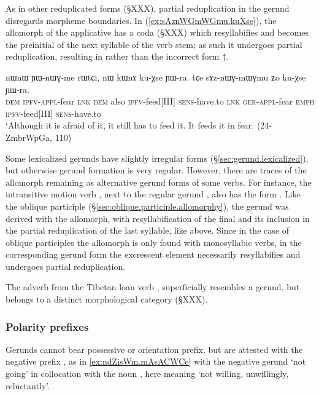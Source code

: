 As in other reduplicated forms (§XXX), partial reduplication in the gerund disregards morpheme boundaries. In (\ref{ex:sAznWGmWGmu.kuXse}), the allomorph  of the applicative has a coda  (§XXX) which resyllabifies and becomes the preinitial of the next syllable of the verb stem; as such it undergoes partial reduplication, resulting in  rather than the incorrect form $\dagger$.


\begin{exe}
\ex \label{ex:sAznWGmWGmu.kuXse}
\gll  nɯnɯ ɲɯ-nɯɣ-me rɯtɕi, nɯ kɯnɤ ku-χse ɲɯ-ra. tɕe sɤz-nɯɣ-mɯ\redp{}ɣmu ʑo ku-χse ɲɯ-ra. \\
\textsc{dem} \textsc{ipfv}-\textsc{appl}-fear \textsc{lnk} \textsc{dem} also \textsc{ipfv}-feed[III] \textsc{sens}-have.to \textsc{lnk} \textsc{ger}-\textsc{appl}-fear \textsc{emph} \textsc{ipfv}-feed[III] \textsc{sens}-have.to \\
\glt `Although it is afraid of it, it still has to feed it. It feeds it in fear. (24-ZmbrWpGa, 110)
\end{exe}

Some lexicalized gerunds have slightly irregular forms (§\ref{sec:gerund.lexicalized}), but otherwise gerund formation is very regular. However, there are traces of the  allomorph remaining as alternative gerund forms of some verbs. For instance, the intransitive motion verb , next to the  regular gerund , also has the form . Like the oblique participle  (§\ref{sec:oblique.participle.allomorphy}), the gerund  was derived with the  allomorph, with resyllabification of the final  and its inclusion in the partial reduplication of the last syllable, like  above. Since in the case of oblique participles the  allomorph is only found with monosyllabic verbs, in the corresponding gerund form the  excrescent element necessarily resyllabifies and undergoes partial reduplication. 


The adverb  from the Tibetan loan verb , superficially resembles a gerund, but belongs to a distinct morphological category (§XXX).

\subsubsection{Polarity prefixes} \label{sec:gerund.neg}
Gerunds cannot bear possessive or orientation prefix, but are attested with the negative prefix , as in \ref{ex:ndZisWm.mAsACWCe} with the negative gerund  `not going' in collocation with the noun , here meaning `not willing, unwillingly, reluctantly'.

